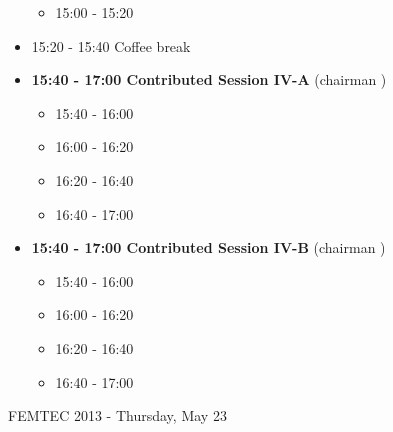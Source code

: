 \documentclass[10pt, A4]{article}%
\begin{document}
\begin{itemize}
\begin{itemize}
    \item 15:00 - 15:20  
  \end{itemize}
  \item 15:20 - 15:40 Coffee break
  \item {\bf 15:40 - 17:00 Contributed Session IV-A} (chairman ) 
  \begin{itemize}
    \item 15:40 - 16:00
    \item 16:00 - 16:20 
    \item 16:20 - 16:40 
    \item 16:40 - 17:00
  \end{itemize}
  \item {\bf 15:40 - 17:00 Contributed Session IV-B} (chairman ) 
  \begin{itemize}
    \item 15:40 - 16:00
    \item 16:00 - 16:20 
    \item 16:20 - 16:40 
    \item 16:40 - 17:00
  \end{itemize}  
\end{itemize}

\newpage
\newpage

\centerline{\huge FEMTEC 2013 - Thursday, May 23}
\vspace{4mm}
\end{document}
